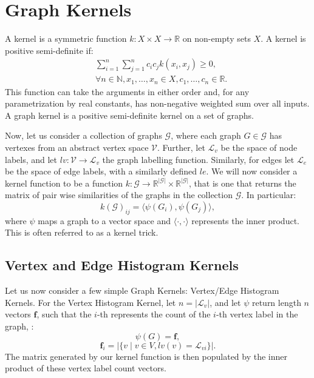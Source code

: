 \chapter{Graph Kernels}
\label{appendix:graph_kernels}

A kernel is a symmetric function $k: X \times X \rightarrow \mathbb{R}$ on
non-empty sets $X$. A kernel is positive semi-definite if:
\begin{align*}
	&\sum_{i=1}^{n} \sum_{j=1}^{n} c_i c_j k(x_i, x_j) \geq 0, \\
	&\forall n \in \mathbb{N}, x_1, \ldots, x_n \in X, c_1, \ldots, c_n \in \mathbb{R}. 
\end{align*}
This function can take the arguments in either order and, for any
parametrization by real constants, has non-negative weighted sum over all
inputs. A graph kernel is a positive semi-definite kernel on a set of graphs.

Now, let us consider a collection of graphs $\mathcal{G}$, where each graph $G
\in \mathcal{G}$ has vertexes from an abstract vertex space $\mathcal{V}$.
Further, let $\mathcal{L}_v$ be the space of node labels, and let $lv:
\mathcal{V} \rightarrow \mathcal{L}_v$ the graph labelling function. Similarly,
for edges let $\mathcal{L}_e$ be the space of edge labels, with a similarly
defined $le$. We will now consider a kernel function to be a function $k:
\mathcal{G} \rightarrow \mathbb{R}^{|\mathcal{G}|} \times
\mathbb{R}^{|\mathcal{G}|}$, that is one that returns the matrix of pair wise
similarities of the graphs in the collection $\mathcal{G}$. In particular:
\begin{equation}
\label{eq:kernel_general}
    k(\mathcal{G})_{ij} = \langle\psi(G_i), \psi(G_j)\rangle,
\end{equation}
%
where $\psi$ maps a graph to a vector space and $\langle\cdot,\cdot\rangle$
represents the inner product. This is often referred to as a kernel trick.

\section{Vertex and Edge Histogram Kernels}
\label{appendix:graph_kernels:histogram}
Let us now consider a few simple Graph Kernels: Vertex/Edge Histogram Kernels.
For the Vertex Histogram Kernel, let $n=|\mathcal{L}_v|$, and let $\psi$ return
length $n$ vectors $\mathbf{f}$, such that the $i$-th represents the count of
the $i$-th vertex label in the graph, \ie: 
\begin{equation}
    \psi(G) = \mathbf{f},
\end{equation}
\begin{equation}
    \mathbf{f}_i=|\{v \mid v \in V, lv(v) = \mathcal{L}_{vi}\}|.
\end{equation}
%
The matrix generated by our kernel function is then populated by the inner
product of these vertex label count vectors.

